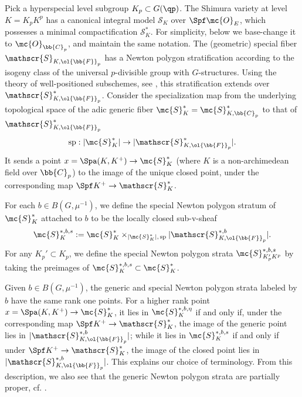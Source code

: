 \documentclass[letterpaper,11pt]{amsart}
\begin{document}
Pick a hyperspecial level subgroup $K_p\subset G(\qp)$. The Shimura variety at level $K=K_pK^p$ has a canonical integral model $\mathscr{S}_K$ over $\Spf \mc{O}_E$, which possesses a minimal compactification $\mathscr{S}_K^\ast$. For simplicity, below we base-change it to $\mc{O}_{\bb{C}_p}$, and maintain the same notation. The (geometric) special fiber $\mathscr{S}_{K,\ol{\bb{F}}_p}$ has a Newton polygon stratification according to the isogeny class of the universal $p$-divisible group with $G$-structures. Using the theory of well-positioned subschemes, see \cite[\S 3.3]{LanStroh}, this stratification extends over $\mathscr{S}_{K,\ol{\bb{F}}_p}^\ast$. Consider the specialization map from the underlying topological space of the adic generic fiber $\mc{S}^\ast_K=\mc{S}^\ast_{K,\bb{C}_p}$ to that of $\mathscr{S}_{K,\ol{\bb{F}}_p}^\ast$
\[\operatorname{sp}:|\mc{S}^\ast_{K}|\to |\mathscr{S}_{K,\ol{\bb{F}}_p}^\ast|.\]
It sends a point $x=\Spa(K,K^+)\to \mc{S}^\ast_{K}$ (where $K$ is a non-archimedean field over $\bb{C}_p$) to the image of the unique closed point, under the corresponding map $\Spf K^+ \to \mathscr{S}^\ast_{K}$.
\begin{definition}
    For each $b\in B(G,\mu^{-1})$, we define the special Newton polygon stratum of $\mc{S}^\ast_{K}$ attached to $b$ to be the locally closed sub-v-sheaf 
    \[\mc{S}^{\ast,b, s}_{K}:=\mc{S}^\ast_{K}\times_{|\mc{S}^\ast_{K}|,\,\operatorname{sp}} |\mathscr{S}_{K,\ol{\bb{F}}_p}^{\ast,b}|.\]
    For any $K_p'\subset K_p$, we define the special Newton polygon strata $\mc{S}^{\ast,b, s}_{K_p'K^p}$ by taking the preimages of $\mc{S}^{\ast,b, s}_{K}\subset \mc{S}_{K}^*$.
\end{definition}
\begin{remark}\label{rem: GenericSpecial}
    Given $b\in B(G,\mu^{-1})$, the generic and special Newton polygon strata labeled by $b$ have the same rank one points. For a higher rank point $x=\Spa(K,K^+)\to \mc{S}_K^\ast$, it lies in $\mc{S}^{\ast,b,\eta}_K$ if and only if, under the corresponding map $\Spf K^+ \to \mathscr{S}^\ast_{K}$, the image of the generic point lies in $|\mathscr{S}_{K,\ol{\bb{F}}_p}^{\ast,b}|$; while it lies in $\mc{S}^{\ast,b,s}_K$ if and only if under $\Spf K^+ \to \mathscr{S}^\ast_{K}$, the image of the closed point lies in $|\mathscr{S}_{K,\ol{\bb{F}}_p}^{\ast,b}|$. This explains our choice of terminology. From this description, we also see that the generic Newton polygon strata are partially proper, cf. \cite[Definition 18.4]{Ecod}.
\end{remark}
\end{document}
